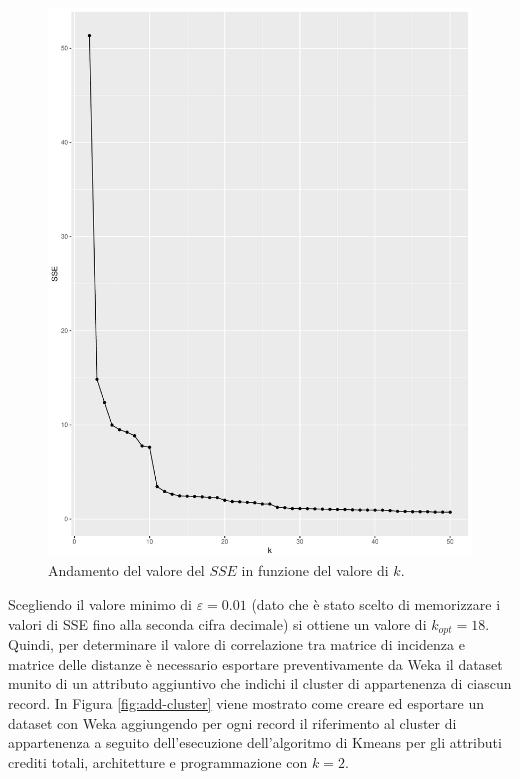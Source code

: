 \documentclass[12pt]{article}
\begin{document}
\begin{figure}[H]
	\includegraphics[width=\textwidth]{img/k-sse-crediti-totali-arc-prg.pdf}
	\caption{Andamento del valore del $SSE$ in funzione del valore di $k$.}
	\label{fig:k-sse1}
\end{figure}

Scegliendo il valore minimo di $\varepsilon=0.01$ (dato che è stato scelto di memorizzare i valori di SSE fino alla seconda cifra decimale) si ottiene un valore di $k_{opt}=18$. Quindi, per determinare il valore di correlazione tra matrice di incidenza e matrice delle distanze è necessario esportare preventivamente da Weka il dataset munito di un attributo aggiuntivo che indichi il cluster di appartenenza di ciascun record. In Figura \ref{fig:add-cluster} viene mostrato come creare ed esportare un dataset con Weka aggiungendo per ogni record il riferimento al cluster di appartenenza a seguito dell'esecuzione dell'algoritmo di Kmeans per gli attributi crediti totali, architetture e programmazione con $k=2$.
\end{document}
